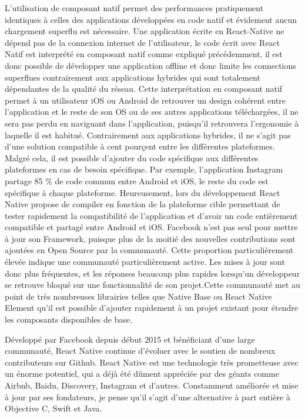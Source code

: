 L’utilisation de composant natif permet des performances pratiquement identiques à celles des applications développées en code natif et évidement aucun chargement superflu est nécessaire. Une application écrite en React-Native ne dépend pas de la connexion internet de l’utilisateur, le code écrit avec React Natif est interprété en composant natif comme expliqué précédemment, il est donc possible de développer une application offline et donc limite les connections superflues contrairement aux applications hybrides qui sont totalement dépendantes de la qualité du réseau.  Cette interprétation en composant natif permet à un utilisateur iOS ou Android de retrouver un design cohérent entre l’application et le reste de son OS ou de ses autres applications téléchargées, il ne sera pas perdu en naviguant dans l’application, puisqu’il retrouvera l’ergonomie à laquelle il est habitué.
Contrairement aux applications hybrides, il ne s’agit pas d’une solution compatible à cent pourçent entre les différentes plateformes. Malgré cela, il est possible d'ajouter du code spécifique aux différentes plateformes en cas de besoin spécifique. Par exemple, l’application Instagram partage 85 \%  de code commun entre Android et iOS, le reste du code est spécifique à chaque plateforme. Heureusement, lors du développement React Native propose de compiler en fonction de la plateforme cible permettant de tester rapidement la compatibilité de l'application et d'avoir un code entièrement compatible et partagé entre Android et iOS. Facebook n’est pas seul pour mettre à jour son Framework, puisque plus de la moitié des nouvelles contributions sont ajoutées en Open Source par la communauté. Cette proportion particulièrement élevée indique une communauté particulièrement active. Les mises à jour sont donc plus fréquentes, et les réponses beaucoup plus rapides lorsqu’un développeur se retrouve bloqué sur une fonctionnalité de son projet.Cette communauté met au point de  très nombreuses librairies telles que Native Base ou React Native Element qu'il est possible d'ajouter rapidement à un projet existant pour étendre les composants disponibles de base.

 

Développé par Facebook depuis début 2015 et bénéficiant d’une large communauté, React Native continue d’évoluer avec le soutien de nombreux contributeurs sur Github. React Native est une technologie très prometteuse avec un énorme potentiel, qui a déjà été dûment appréciée par des géants comme Airbnb, Baidu, Discovery, Instagram et d’autres. Constamment améliorée et mise à jour par ses fondateurs, je pense qu'il s'agit d'une alternative à part entière à Objective C, Swift et Java.
 

